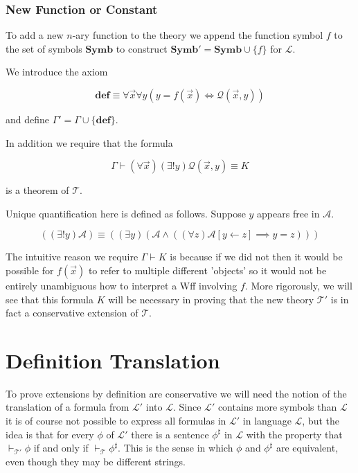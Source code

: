 \documentclass[12pt]{article}
\newcommand{\bv}[1]{\boldsymbol{#1}}
\newcommand{\mc}[1]{\mathcal{#1}}
\newcommand{\bc}[1]{\bv{\mc{#1}}}
\begin{document}
\subsubsection*{New Function or Constant}

To add a new $n$-ary function to the theory we append the function symbol $f$ to the set of symbols $\textbf{Symb}$ to construct $\textbf{Symb}' = \textbf{Symb}\cup\{f\}$ for $\bv{\mc{L}}$.

We introduce the axiom

\begin{equation}
\textbf{def} \equiv \forall \vec{x} \forall y(y=f(\vec{x})\iff \mc{Q}(\vec{x},y))
\end{equation}

and define $\Gamma' = \Gamma \cup \{\textbf{def}\}$.

In addition we require that the formula

\begin{equation}
\Gamma \vdash (\forall \vec{x})(\exists! y) \mc{Q}(\vec{x},y) \equiv K
\end{equation}

is a theorem of $\bc{T}$.

Unique quantification here is defined as follows. Suppose $y$ appears free in $\mc{A}$.

\begin{equation}
((\exists!y)\mc{A}) \equiv ((\exists y)(\mc{A} \land ((\forall z)\mc{A}[y\leftarrow z] \implies y=z)))
\end{equation}

The intuitive reason we require $\Gamma \vdash K$ is because if we did not then it would be possible for $f(\vec{x})$ to refer to multiple different 'objects' so it would not be entirely unambiguous how to interpret a Wff involving $f$. More rigorously, we will see that this formula $K$ will be necessary in proving that the new theory $\bc{T}'$ is in fact a conservative extension of $\bc{T}$.

\section{Definition Translation}

To prove extensions by definition are conservative we will need the notion of the translation of a formula from $\bv{\mc{L}}'$ into $\bv{\mc{L}}$. Since $\bv{\mc{L}}'$ contains more symbols than $\bv{\mc{L}}$ it is of course not possible to express all formulas in $\bv{\mc{L}}'$ in language $\bv{\mc{L}}$, but the idea is that for every $\phi$ of $\bv{\mc{L}}'$ there is a sentence $\phi^\sharp$ in $\bv{\mc{L}}$ with the property that $\vdash_{\bc{T}'}\phi$ if and only if $\vdash_{\bc{T}}\phi^{\sharp}$. This is the sense in which $\phi$ and $\phi^{\sharp}$ are equivalent, even though they may be different strings.
\end{document}
